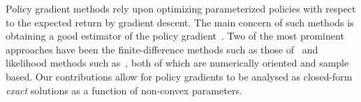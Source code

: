 Policy gradient methods rely upon optimizing parameterized policies with respect to the expected return by gradient descent. The main concern of such methods is obtaining a good estimator of the policy gradient~\parencite{Peters_IRS_2006}. Two of the most prominent approaches have been the finite-difference methods such as those of~\parencite{Ng_UAI_2000} and likelihood methods such as~\parencite{Baxter_ISCAS_2000}, both of which are numerically oriented and sample based. Our contributions allow for policy gradients to be analysed as closed-form \textit{exact} solutions as a function of non-convex parameters.

